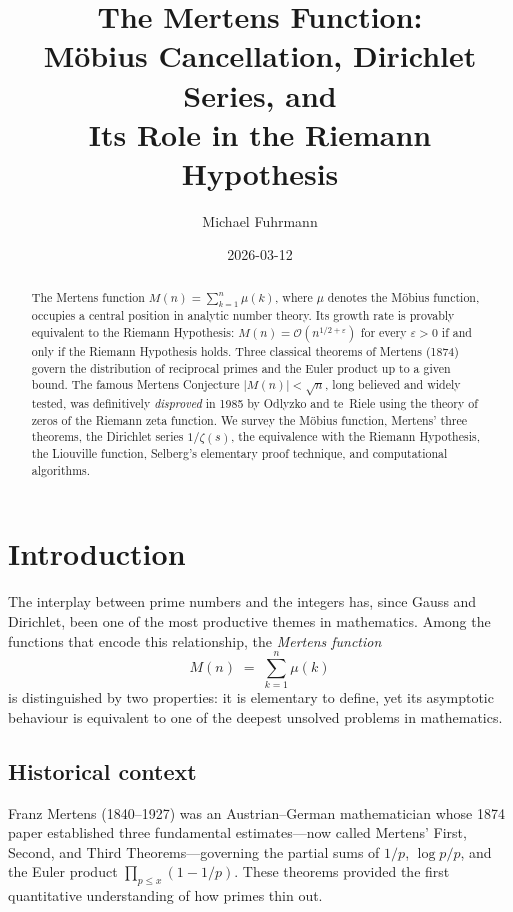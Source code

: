\documentclass[12pt,a4paper]{amsart}
\title{The Mertens Function:\\
Möbius Cancellation, Dirichlet Series, and\\
Its Role in the Riemann Hypothesis}
\author{Michael Fuhrmann}
\date{2026-03-12}
\theoremstyle{definition}
\newcommand{\BigO}{\mathcal{O}}
\begin{document}
\begin{abstract}
The Mertens function $M(n) = \sum_{k=1}^{n} \mu(k)$, where $\mu$ denotes
the Möbius function, occupies a central position in analytic number theory.
Its growth rate is provably equivalent to the Riemann Hypothesis: $M(n) =
\BigO(n^{1/2+\varepsilon})$ for every $\varepsilon > 0$ if and only if the
Riemann Hypothesis holds.
Three classical theorems of Mertens (1874) govern the distribution of
reciprocal primes and the Euler product up to a given bound.
The famous Mertens Conjecture $|M(n)| < \sqrt{n}$, long believed and
widely tested, was definitively \emph{disproved} in 1985 by Odlyzko and
te~Riele using the theory of zeros of the Riemann zeta function.
We survey the Möbius function, Mertens' three theorems, the Dirichlet series
$1/\zeta(s)$, the equivalence with the Riemann Hypothesis, the Liouville
function, Selberg's elementary proof technique, and computational algorithms.
\end{abstract}

\maketitle
\tableofcontents

\section{Introduction}
\label{sec:intro}

The interplay between prime numbers and the integers has, since Gauss and
Dirichlet, been one of the most productive themes in mathematics.  Among the
functions that encode this relationship, the \emph{Mertens function}
\[
  M(n) \;=\; \sum_{k=1}^{n} \mu(k)
\]
is distinguished by two properties: it is elementary to define, yet its
asymptotic behaviour is equivalent to one of the deepest unsolved problems in
mathematics.

\subsection*{Historical context}

Franz Mertens (1840--1927) was an Austrian--German mathematician whose 1874
paper \cite{Mertens1874} established three fundamental estimates---now called
Mertens' First, Second, and Third Theorems---governing the partial sums of
$1/p$, $\log p/p$, and the Euler product $\prod_{p \le x}(1-1/p)$.  These
theorems provided the first quantitative understanding of how primes thin out.
\end{document}
